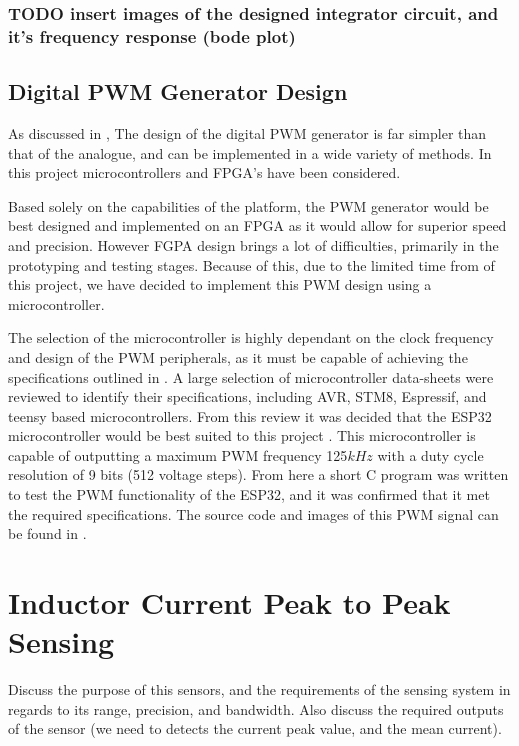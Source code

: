 \subsubsection{TODO insert images of the designed integrator circuit, and it's frequency response (bode plot)} 

\subsection{Digital PWM Generator Design}\label{S:PWM_digital_design}

As discussed in , The design of the digital PWM generator is far simpler than that of the analogue, and can be implemented in a wide variety of methods. In this project microcontrollers and FPGA's have been considered.

Based solely on the capabilities of the platform, the PWM generator would be best designed and implemented on an FPGA as it would allow for superior speed and precision. However FGPA design brings a lot of difficulties, primarily in the prototyping and testing stages. Because of this, due to the limited time from of this project, we have decided to implement this PWM design using a microcontroller.

The selection of the microcontroller is highly dependant on the clock frequency and design of the PWM peripherals, as it must be capable of achieving the specifications outlined in . A large selection of microcontroller data-sheets were reviewed to identify their specifications, including AVR, STM8, Espressif, and teensy based microcontrollers. From this review it was decided that the ESP32 microcontroller would be best suited to this project \cite{ESP32Manual}. This microcontroller is capable of outputting a maximum PWM frequency 125$kHz$ with a duty cycle resolution of 9 bits (512 voltage steps). From here a short C program was written to test the PWM functionality of the ESP32, and it was confirmed that it met the required specifications. The source code and images of this PWM signal can be found in .
 

%
%

\section{Inductor Current Peak to Peak Sensing}\label{S:current_sense_design}

Discuss the purpose of this sensors, and the requirements of the sensing system in regards to its range, precision, and bandwidth. Also discuss the required outputs of the sensor (we need to detects the current peak value, and the mean current).


